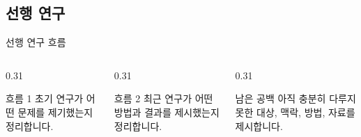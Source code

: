 \subsection{선행 연구}
\begin{frame}[t]{선행 연구 흐름}
\small

\begin{columns}[T]

\begin{column}{0.31\textwidth}
\begin{block}{흐름 1}
\scriptsize
초기 연구가 어떤 문제를 제기했는지 정리합니다.
\end{block}
\end{column}

\begin{column}{0.31\textwidth}
\begin{block}{흐름 2}
\scriptsize
최근 연구가 어떤 방법과 결과를 제시했는지 정리합니다.
\end{block}
\end{column}

\begin{column}{0.31\textwidth}
\begin{alertblock}{남은 공백}
\scriptsize
아직 충분히 다루지 못한 대상, 맥락, 방법, 자료를 제시합니다.
\end{alertblock}
\end{column}
\end{columns}

\vspace{0.25cm}


\end{frame}

